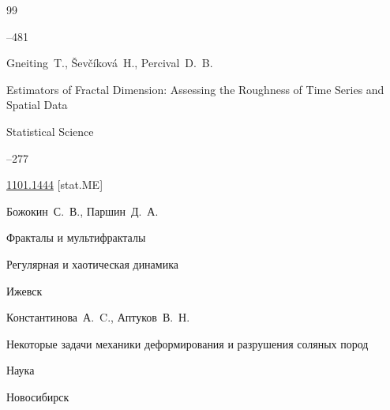 \begin{thebibliography}{99}

--481







\by Gneiting~T.,  Ševčíková~H., Percival~D.~B. 

\paper Estimators of Fractal Dimension: Assessing the Roughness of Time Series and Spatial Data

\jour Statistical Science




--277


\arxiv \href{https://arxiv.org/abs/1101.1444}{1101.1444} [stat.ME]






\by Божокин~С.~В., Паршин~Д.~А.

\book Фракталы и мультифракталы


\publ Регулярная и хаотическая динамика

\publaddr Ижевск












\by Константинова~А.~C., Аптуков~В.~Н. 

\book Некоторые задачи механики деформирования и разрушения соляных пород


\publ  Наука

\publaddr Новосибирск





\end{thebibliography}
